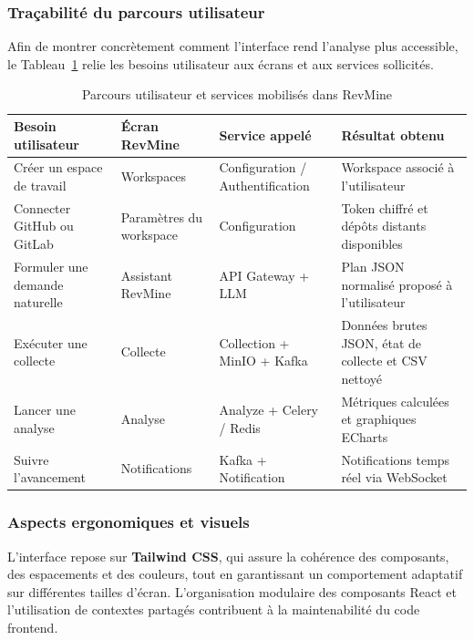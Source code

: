 \subsubsection{Traçabilité du parcours utilisateur}

Afin de montrer concrètement comment l'interface rend l'analyse plus accessible, le
Tableau~\ref{tab:frontend-parcours} relie les besoins utilisateur aux écrans et aux services
sollicités.

\begin{table}[H]
\centering
\small
\caption{Parcours utilisateur et services mobilisés dans RevMine}
\label{tab:frontend-parcours}
\begin{tabular}{|>{\raggedright\arraybackslash}p{3.4cm}
                |>{\raggedright\arraybackslash}p{3.2cm}
                |>{\raggedright\arraybackslash}p{3.4cm}
                |>{\raggedright\arraybackslash}p{3.4cm}|}
\hline
\textbf{Besoin utilisateur} & \textbf{Écran RevMine} & \textbf{Service appelé} & \textbf{Résultat obtenu} \\
\hline
Créer un espace de travail & Workspaces & Configuration / Authentification & Workspace associé à l'utilisateur \\
\hline
Connecter GitHub ou GitLab & Paramètres du workspace & Configuration & Token chiffré et dépôts distants disponibles \\
\hline
Formuler une demande naturelle & Assistant RevMine & API Gateway + LLM & Plan JSON normalisé proposé à l'utilisateur \\
\hline
Exécuter une collecte & Collecte & Collection + MinIO + Kafka & Données brutes JSON, état de collecte et CSV nettoyé \\
\hline
Lancer une analyse & Analyse & Analyze + Celery / Redis & Métriques calculées et graphiques ECharts \\
\hline
Suivre l'avancement & Notifications & Kafka + Notification & Notifications temps réel via WebSocket \\
\hline
\end{tabular}
\end{table}

\subsubsection{Aspects ergonomiques et visuels}

L'interface repose sur \textbf{Tailwind CSS}, qui assure la cohérence des composants, des
espacements et des couleurs, tout en garantissant un comportement adaptatif sur différentes
tailles d'écran. L'organisation modulaire des composants React et l'utilisation de contextes
partagés contribuent à la maintenabilité du code frontend.

